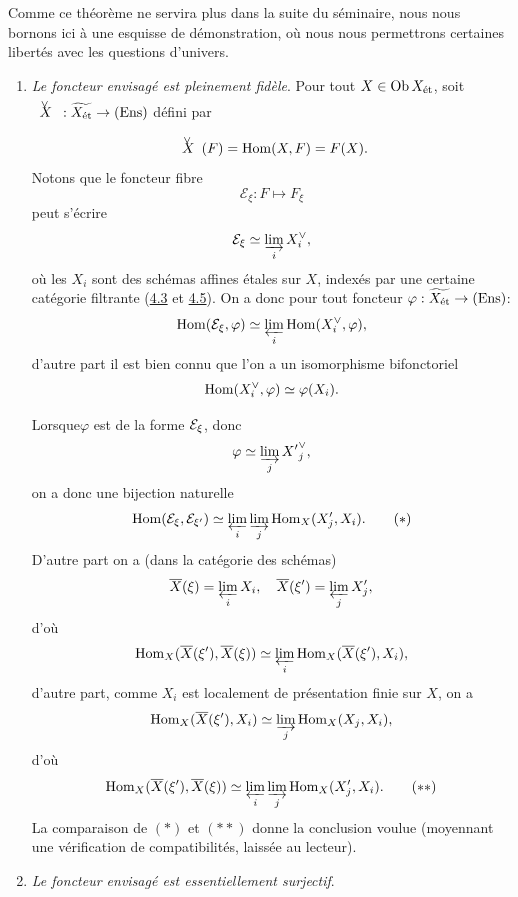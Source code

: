 \documentclass[10pt]{../fichiers-configuration-latex/smfart}
\begin{document}
Comme ce théorème ne servira plus dans la suite du séminaire, nous
nous bornons ici à une esquisse de démonstration, où nous nous
permettrons certaines libertés avec les questions d'univers.
\begin{enumerate}
\renewcommand{\theenumi}{\alph{enumi}}
\renewcommand{\labelenumi}{\theenumi)}
\item \emph{Le foncteur envisagé est pleinement fidèle}. Pour
  tout $X \in \operatorname{Ob}
  X_{\text{ét}}$, soit $\Xv : \widetilde{X_{\text{ét}}} \to
  (\Ens)$ défini par
$$
\Xv (F) = \Hom(X, F) = F(X){\quoi}.
$$
Notons que le foncteur fibre
$$
\mathcal{E}_{\xi} : F \mapsto F_{\xi}
$$
peut s'écrire
$$
\mathcal{E}_{\xi} \simeq \varinjlim_i X^{\vee}_i{},
$$
où les $X_i$ sont des schémas affines étales sur $X$,
indexés par une
certaine catégorie filtrante (\cf \hyperref[VIII.def4.3]{4.3} et
\hyperref[VIII.subsec4.5]{4.5}). On a donc pour tout
foncteur $\varphi : \widetilde{X_{\text{ét}}} \to (\Ens)$:
$$
\operatorname{Hom}(\mathcal{E}_{\xi}, \varphi) \simeq \varprojlim_{i}
\operatorname{Hom}(X^{\vee}_i, \varphi){},
$$
d'autre part il est bien connu que l'on a un isomorphisme bifonctoriel
$$
\operatorname{Hom}(X^{\vee}_i, \varphi) \simeq \varphi (X_i){}.
$$

Lorsque\pageoriginale $\varphi$ est de la forme ${\mathcal E}_{\xi}$, donc
$$
\varphi \simeq \varinjlim_j {X'}_j^{\vee}{},
$$
on a donc une bijection naturelle
\begin{equation*}
\operatorname{Hom} (\mathcal{E}_{\xi}, \mathcal{E}_{\xi'}) \simeq
\varprojlim_{i} \varinjlim_{j} \operatorname{Hom}_X (X'_j, X_i){}.\tag{$\ast$}
\end{equation*}
D'autre part on a (dans la catégorie des schémas)
$$
\overline{X}(\xi) = \varprojlim_{i} X_i,\quad \overline{X} (\xi') =
\varprojlim_{j} X'_j{},
$$
d'où
$$
\operatorname{Hom}_{X} (\overline{X} (\xi'), \overline{X}(\xi)) \simeq \varprojlim_{i}
\operatorname{Hom}_X (\overline{X} (\xi'), X_i){},
$$
d'autre part, comme $X_i$ est localement de présentation finie sur
$X$, on a
$$
\operatorname{Hom}_X (\overline{X} (\xi'), X_i) \simeq \varinjlim_{j}
\operatorname{Hom}_X (X_j, X_i){},
$$
d'où
\begin{equation*}
\Hom_X (\bar{X} (\xi'), \bar{X} (\xi) ) \simeq
\varprojlim_{i} \varinjlim_{j} \Hom_X (X'_j,
X_i){\quoi}.\tag{${\ast}{\ast}$}
\end{equation*}
La comparaison de $(\ast)$ et $({\ast}{\ast})$ donne la conclusion voulue
(moyennant une vérification de compatibilités, laissée au lecteur).

\item \emph{Le foncteur envisagé est essentiellement surjectif}.
\end{enumerate}
\end{document}

